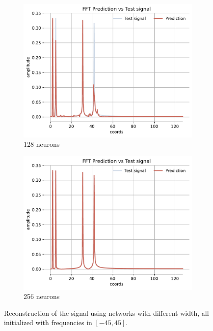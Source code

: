 \begin{figure}[h!]
\begin{subfigure}[b]{0.32\textwidth}
        \centering
        \includegraphics[width=\textwidth]{img/ch3/fft_w45all_hf128.pdf}
        \caption{128 neurons}
        \label{fig:fft-128-full-45}
    \end{subfigure}
    \begin{subfigure}[b]{0.32\textwidth}
        \centering
        \includegraphics[width=\textwidth]{img/ch3/fft_w45all_hf256.pdf}
        \caption{256 neurons}
        \label{fig:fft-256-full-45}
    \end{subfigure}
    \label{fig:all-freqs-reconstruction}
    \caption{Reconstruction of the signal using networks with different width, all initialized with frequencies in $[-45, 45]$.}
\end{figure}


